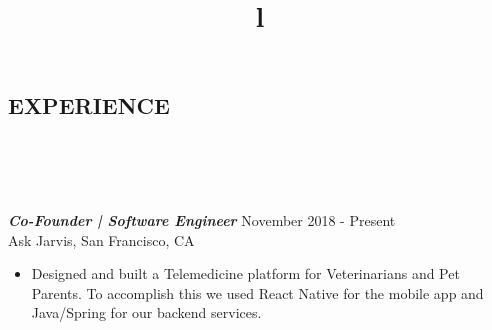 \documentclass[overlapped, 10pt]{res} %
\begin{document}
\begin{resume}

 



\section{EXPERIENCE}\smallskip 

\begin{format}
\title{l}\\
\\
\body\\
\end{format}


{\sl \textbf{Co-Founder | Software Engineer}} \hfill November 2018 - Present \\
Ask Jarvis, San Francisco, CA
\begin{itemize}
\item Designed and built a Telemedicine platform for Veterinarians and Pet Parents. To accomplish this we used React Native for the mobile app and Java/Spring for our backend services.
\end{itemize}


\end{resume}
\end{document}
